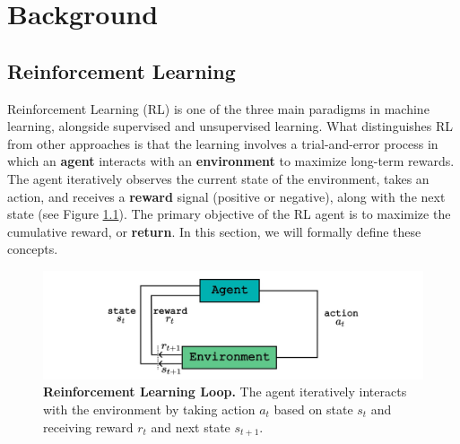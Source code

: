 
\chapter{Background}
\label{sec:background}

\section{Reinforcement Learning}
\label{sec:reinforcement_learning}


Reinforcement Learning (RL) \cite{sutton2018reinforcement} is one of the three main paradigms in machine learning, alongside supervised and unsupervised learning. What distinguishes RL from other approaches is that the learning involves a trial-and-error process in which an \textbf{agent} interacts with an \textbf{environment} to maximize long-term rewards. The agent iteratively observes the current state of the environment, takes an action, and receives a \textbf{reward} signal (positive or negative), along with the next state (see Figure \ref{fig:rl_loop}). The primary objective of the RL agent is to maximize the cumulative reward, or \textbf{return}. In this section, we will formally define these concepts.

\begin{figure}[H]
    \centering
    \includegraphics[width=1\linewidth]{Figures/rl_loop.jpg}
    \caption[Reinforcement Learning Loop]{\textbf{Reinforcement Learning Loop.} The agent iteratively interacts with the environment by taking action \(a_t\) based on state \(s_t\) and receiving reward \(r_t\) and next state \(s_{t+1}\).}
    \label{fig:rl_loop}
\end{figure}

